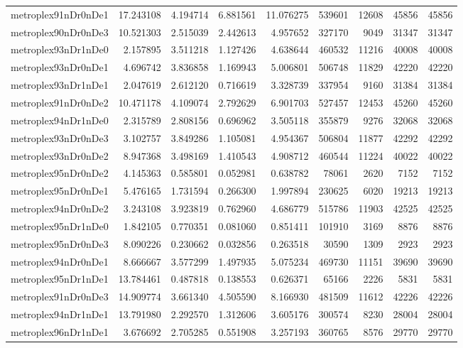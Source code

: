 \begin{longtable}{|l|r|r|r|r|r|r|r|r|}
metroplex91nDr0nDe1 & 17.243108 & 4.194714 & 6.881561 & 11.076275 & 539601 & 12608 & 45856 & 45856 \\
metroplex90nDr0nDe3 & 10.521303 & 2.515039 & 2.442613 & 4.957652 & 327170 & 9049 & 31347 & 31347 \\
metroplex93nDr1nDe0 & 2.157895 & 3.511218 & 1.127426 & 4.638644 & 460532 & 11216 & 40008 & 40008 \\
metroplex93nDr0nDe1 & 4.696742 & 3.836858 & 1.169943 & 5.006801 & 506748 & 11829 & 42220 & 42220 \\
metroplex93nDr1nDe1 & 2.047619 & 2.612120 & 0.716619 & 3.328739 & 337954 & 9160 & 31384 & 31384 \\
metroplex91nDr0nDe2 & 10.471178 & 4.109074 & 2.792629 & 6.901703 & 527457 & 12453 & 45260 & 45260 \\
metroplex94nDr1nDe0 & 2.315789 & 2.808156 & 0.696962 & 3.505118 & 355879 & 9276 & 32068 & 32068 \\
metroplex93nDr0nDe3 & 3.102757 & 3.849286 & 1.105081 & 4.954367 & 506804 & 11877 & 42292 & 42292 \\
metroplex93nDr0nDe2 & 8.947368 & 3.498169 & 1.410543 & 4.908712 & 460544 & 11224 & 40022 & 40022 \\
metroplex95nDr0nDe2 & 4.145363 & 0.585801 & 0.052981 & 0.638782 & 78061 & 2620 & 7152 & 7152 \\
metroplex95nDr0nDe1 & 5.476165 & 1.731594 & 0.266300 & 1.997894 & 230625 & 6020 & 19213 & 19213 \\
metroplex94nDr0nDe2 & 3.243108 & 3.923819 & 0.762960 & 4.686779 & 515786 & 11903 & 42525 & 42525 \\
metroplex95nDr1nDe0 & 1.842105 & 0.770351 & 0.081060 & 0.851411 & 101910 & 3169 & 8876 & 8876 \\
metroplex95nDr0nDe3 & 8.090226 & 0.230662 & 0.032856 & 0.263518 & 30590 & 1309 & 2923 & 2923 \\
metroplex94nDr0nDe1 & 8.666667 & 3.577299 & 1.497935 & 5.075234 & 469730 & 11151 & 39690 & 39690 \\
metroplex95nDr1nDe1 & 13.784461 & 0.487818 & 0.138553 & 0.626371 & 65166 & 2226 & 5831 & 5831 \\
metroplex91nDr0nDe3 & 14.909774 & 3.661340 & 4.505590 & 8.166930 & 481509 & 11612 & 42226 & 42226 \\
metroplex94nDr1nDe1 & 13.791980 & 2.292570 & 1.312606 & 3.605176 & 300574 & 8230 & 28004 & 28004 \\
metroplex96nDr1nDe1 & 3.676692 & 2.705285 & 0.551908 & 3.257193 & 360765 & 8576 & 29770 & 29770 \\

\end{longtable}
